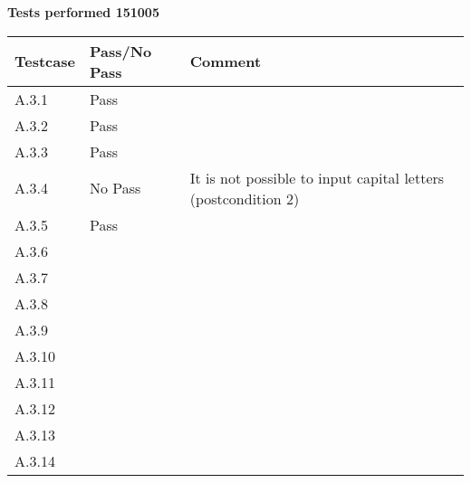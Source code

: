 \renewcommand{\testdate}{151005}
\textbf{ Tests performed \testdate}
\begin{center}
  	\begin{tabular}{| p{3cm} | p{5cm} | p{5cm} |}
    		\hline
	    	\textbf{Testcase}			& \textbf{Pass/No Pass} 	& \textbf{Comment} \\ \hline
    		A.3.1		 					& Pass  							&  				\\ \hline
    		A.3.2		 					& Pass 							& 				 \\	\hline
    		A.3.3		 					& Pass 							& 				 \\	\hline
    		A.3.4		 					& No Pass 					& It is not possible to input capital letters (postcondition 2)				 \\	\hline
    		A.3.5		 					& Pass 							& 				 \\	\hline
    		A.3.6		 					&  							& 				 \\	\hline
    		A.3.7		 					&  							& 				 \\	\hline
    		A.3.8		 					&  							& 				 \\	\hline
    		A.3.9		 					&  							& 				 \\	\hline
    		A.3.10	 						&  							& 				 \\	\hline
    		A.3.11	 						&  							& 				 \\	\hline
    		A.3.12	 						&  							& 				 \\	\hline
    		A.3.13	 						&  							& 				 \\	\hline
    		A.3.14	 						&  							& 				 \\	\hline
 	\end{tabular}
\end{center}